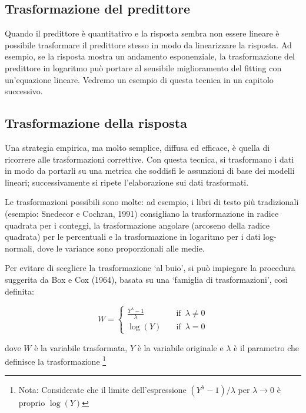 \documentclass[
  12pt,
]{book}
\begin{document}
\hypertarget{trasformazione-del-predittore}{%
\subsection{Trasformazione del predittore}\label{trasformazione-del-predittore}}

Quando il predittore è quantitativo e la risposta sembra non essere lineare è possibile trasformare il predittore stesso in modo da linearizzare la risposta. Ad esempio, se la risposta mostra un andamento esponenziale, la trasformazione del predittore in logaritmo può portare al sensibile miglioramento del fitting con un'equazione lineare. Vedremo un esempio di questa tecnica in un capitolo successivo.

\hypertarget{trasformazione-della-risposta}{%
\subsection{Trasformazione della risposta}\label{trasformazione-della-risposta}}

Una strategia empirica, ma molto semplice, diffusa ed efficace, è quella di ricorrere alle trasformazioni correttive. Con questa tecnica, si trasformano i dati in modo da portarli su una metrica che soddisfi le assunzioni di base dei modelli lineari; successivamente si ripete l'elaborazione sui dati trasformati.

Le trasformazioni possibili sono molte: ad esempio, i libri di testo più tradizionali (esempio: Snedecor e Cochran, 1991) consigliano la trasformazione in radice quadrata per i conteggi, la trasformazione angolare (arcoseno della radice quadrata) per le percentuali e la trasformazione in logaritmo per i dati log-normali, dove le variance sono proporzionali alle medie.

Per evitare di scegliere la trasformazione `al buio', si può impiegare la procedura suggerita da Box e Cox (1964), basata su una `famiglia di trasformazioni', così definita:

\[ W = \left\{ \begin{array}{ll}
\frac{Y^\lambda - 1}{\lambda} & \quad \textrm{if} \,\,\, \lambda \neq 0 \\
\log(Y) & \quad \textrm{if} \,\,\, \lambda = 0
\end{array} \right.\]

dove \(W\) è la variabile trasformata, \(Y\) è la variabile originale e \(\lambda\) è il parametro che definisce la trasformazione \footnote{Nota: Considerate che il limite dell'espressione \((Y^\lambda -1)/\lambda\) per \(\lambda \rightarrow 0\) è proprio \(\log(Y)\)}
\end{document}
